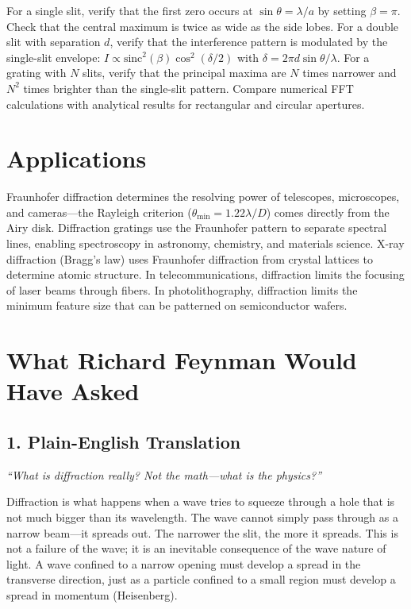 For a single slit, verify that the first zero occurs at $\sin\theta = \lambda/a$ by setting $\beta = \pi$. Check that the central maximum is twice as wide as the side lobes. For a double slit with separation $d$, verify that the interference pattern is modulated by the single-slit envelope: $I \propto \text{sinc}^2(\beta)\cos^2(\delta/2)$ with $\delta = 2\pi d\sin\theta/\lambda$. For a grating with $N$ slits, verify that the principal maxima are $N$ times narrower and $N^2$ times brighter than the single-slit pattern. Compare numerical FFT calculations with analytical results for rectangular and circular apertures.
\section*{Applications}

Fraunhofer diffraction determines the resolving power of telescopes, microscopes, and cameras---the Rayleigh criterion ($\theta_{\min} = 1.22\lambda/D$) comes directly from the Airy disk. Diffraction gratings use the Fraunhofer pattern to separate spectral lines, enabling spectroscopy in astronomy, chemistry, and materials science. X-ray diffraction (Bragg's law) uses Fraunhofer diffraction from crystal lattices to determine atomic structure. In telecommunications, diffraction limits the focusing of laser beams through fibers. In photolithography, diffraction limits the minimum feature size that can be patterned on semiconductor wafers.
\section*{What Richard Feynman Would Have Asked}

\subsection*{1. Plain-English Translation}
\textit{``What is diffraction really? Not the math---what is the physics?''}

Diffraction is what happens when a wave tries to squeeze through a hole that is not much bigger than its wavelength. The wave cannot simply pass through as a narrow beam---it spreads out. The narrower the slit, the more it spreads. This is not a failure of the wave; it is an inevitable consequence of the wave nature of light. A wave confined to a narrow opening must develop a spread in the transverse direction, just as a particle confined to a small region must develop a spread in momentum (Heisenberg).

